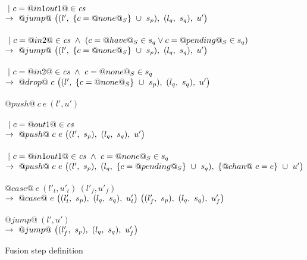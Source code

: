 \begin{figure}
\begin{tabbing}
\> \> \\
\> \> $~|~c=@in1out1@\in\textit{cs}$ \\
\> \> $\to~@jump@~
      \big((l',~\{ c=@none@_S \}~\cup~s_p),~(l_q,~s_q),~u' \big)
      $ \\

\> \> \\
\> \> $~|~c=@in2@\in\textit{cs} ~\wedge~ (c=@have@_S \in s_q \vee c=@pending@_S \in s_q)$ \\
\> \> $\to~@jump@~
      \big((l',~\{ c=@none@_S \}~\cup~s_p),~(l_q,~s_q),~u' \big)
      $ \\


\> \> \\
\> \> $~|~c=@in2@\in\textit{cs} ~\wedge~ c=@none@_S \in s_q$ \\
\> \> $\to~@drop@~c~
      \big((l',~\{ c=@none@_S \}~\cup~s_p),~(l_q,~s_q),~u' \big)
      $ \\
\\

\> $@push@~c~e~(l',u')$ \\
\> \> \\
\> \> $~|~c=@out1@\in\textit{cs}$ \\
\> \> $\to~@push@~c~e~
      \big((l',~s_p),~(l_q,~s_q),~u' \big)
      $ \\

\> \> \\
\> \> $~|~c=@in1out1@\in\textit{cs} ~\wedge~ c=@none@_S \in s_q$ \\
\> \> $\to~@push@~c~e~
      \big((l',~s_p),~(l_q,~\{ c=@pending@_S \}~\cup~s_q),~\{ @chan@~c=e \}~\cup~u' \big)
      $ \\

\\

\> $@case@~e~(l'_t,u'_t)~(l'_f,u'_f)$ \\
\> \> $\to~@case@~e~
      \big((l'_t,~s_p),~(l_q,~s_q),~u'_t \big)
      ~
      \big((l'_f,~s_p),~(l_q,~s_q),~u'_f \big)
      $ \\

\\

\> $@jump@~(l',u')$ \\
\> \> $\to~@jump@~
      \big((l'_f,~s_p),~(l_q,~s_q),~u'_f \big)
      $ \\
\end{tabbing}

\caption{Fusion step definition}
\label{fig:Fusion:Def:Step}
\end{figure}

